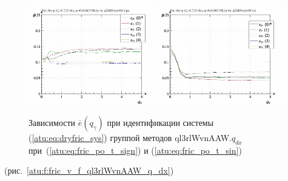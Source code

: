 \begin{figure}[htb!]
  \centerline{
    \includegraphics[width=0.49\textwidth]{p/cha/fric/ql3rlWvnAAW/fric_id-p_q_gamma_sign.png}
    \hfill
    \includegraphics[width=0.49\textwidth]{p/cha/fric/ql3rlWvnAAW/fric_id-p_q_gamma_sin.png}
  }
  \caption{Зависимости $\overline{e}(q_\gamma)$ при идентификации системы (\ref{atu:eq:dryfric_sys}) группой методов ql3rlWvnAAW.$q_{dx}$
   при~(\ref{atu:eq:fric_po_t_sign}) и (\ref{atu:eq:fric_po_t_sin})}
  \label{atu:f:fric_q_gamma_ql3rlWvnAAW_q_dx}
\end{figure}


(рис.~\ref{atu:f:fric_v_f_ql3rlWvnAAW_q_dx})

